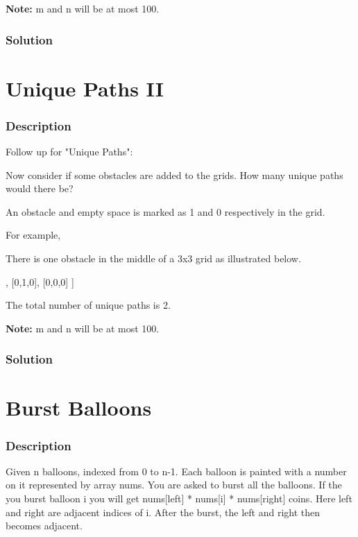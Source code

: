 \textbf{Note:} m and n will be at most 100.

\subsubsection{Solution}

\begin{Code}

\end{Code}

\newpage

\section{Unique Paths II} %

\subsubsection{Description}
Follow up for "Unique Paths":

Now consider if some obstacles are added to the grids. How many unique paths would there be?

An obstacle and empty space is marked as 1 and 0 respectively in the grid.

For example,

There is one obstacle in the middle of a 3x3 grid as illustrated below.
\begin{Code}
[
  [0,0,0],
  [0,1,0],
  [0,0,0]
]
\end{Code}

The total number of unique paths is 2.

\textbf{Note:} m and n will be at most 100.

\subsubsection{Solution}

\begin{Code}

\end{Code}

\newpage

\section{Burst Balloons} %

\subsubsection{Description}
Given n balloons, indexed from 0 to n-1. Each balloon is painted with a number on it represented by array nums. You are asked to burst all the balloons. If the you burst balloon i you will get nums[left] * nums[i] * nums[right] coins. Here left and right are adjacent indices of i. After the burst, the left and right then becomes adjacent.

